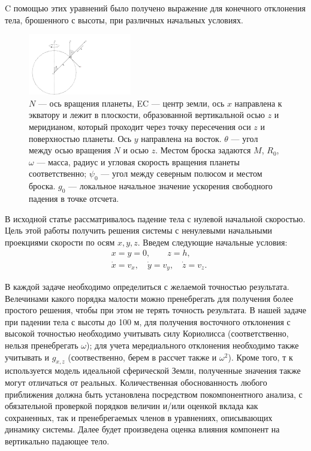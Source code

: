 \documentclass[hoptionsi, twocolumn]{revtex4-2}
\begin{document}
 C помощью этих уравнений было получено выражение для конечного отклонения тела, брошенного с высоты, при различных начальных условиях.\\
\begin{figure}[h]
\centering
\includegraphics[width=0.4\textwidth]{pick-1.pdf}
\caption{$N$ --- ось вращения планеты, EC --- центр земли, ось $x$ направлена к экватору и  лежит в плоскости, образованной вертикальной осью $z$ и меридианом, который проходит через точку пересечения оси $z$ и поверхностью планеты. Ось $y$ направлена на восток. $\theta$ --- угол между осью вращения $N$ и осью $z$. Местом броска задаются $M$, $R_0$, $\omega$ --- масса, радиус и  угловая скорость вращения планеты соответственно; $\psi_0$ --- угол между северным полюсом и местом броска. $g_0$ --- локальное начальное значение ускорения свободного падения в точке отсчета.}
\label{fig:pick-1}
\end{figure}
В исходной статье рассматривалось падение тела с нулевой начальной скоростью. Цель этой работы получить решения системы с ненулевыми начальными проекциями скорости по осям $x, y, z$. Введем следующие начальные условия:
\begin{equation*}
    \begin{aligned}
        &x =y=0, \qquad z=h,\\
        &\dot x=v_x, \quad \dot y=v_y, \quad \dot z =v_z.
    \end{aligned}
\end{equation*}



В каждой задаче необходимо определиться с желаемой точностью результата. Велечинами какого порядка малости можно пренебрегать для получения более простого решения, чтобы при этом не терять точность результата. В нашей задаче при падении тела с высоты до 100 м, для получения восточного отклонения с высокой точностью необходимо учитывать силу Кориолисса (соответственно, нельзя пренебрегать $\omega$); для учета мередиального отклонения необходимо также учитывать и $g_{x,z}$ (соотвественно, берем в рассчет также и $\omega^2$). Кроме того, т к используется модель идеальной сферической Земли, полученные значения также могут отличаться от реальных.
Количественная обоснованность любого
приближения должна быть установлена посредством покомпонентного анализа, с обязательной проверкой порядков величин и/или
оценкой вклада как сохраненных, так и пренебрегаемых членов в уравнениях, описывающих динамику системы. Далее будет произведена оценка влияния компонент на вертикально падающее тело.
\end{document}
